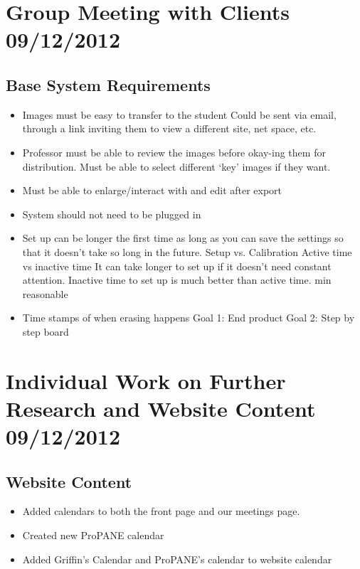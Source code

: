 \documentclass[]{article}
\begin{document}
	\tableofcontents
	\newpage
	
	
	\section{Group Meeting with Clients 09/12/2012}
		\subsection{Base System Requirements}
			\begin{itemize}
				\item Images must be easy to transfer to the student
					\subitem Could be sent via email, through a link inviting them to view a different site, net space, etc.
				\item Professor must be able to review the images before okay-ing them for distribution.
					\subitem Must be able to select different ‘key’ images if they want.
				\item Must be able to enlarge/interact with and edit after export
				\item System should not need to be plugged in
				\item Set up can be longer the first time as long as you can save the settings so that it doesn’t take so long in the future.
					\subitem Setup vs. Calibration
					\subitem Active time vs inactive time
						\subsubitem It can take longer to set up if it doesn’t need constant attention. Inactive time to set up is much better than active time.
					 min reasonable
				\item Time stamps of when erasing happens
					\subitem Goal 1: End product
					\subitem Goal 2: Step by step board
			\end{itemize}
	
	
	\section{Individual Work on Further Research and Website Content 09/12/2012}
		\subsection{Website Content}
			\begin{itemize}
				\item Added calendars to both the front page and our meetings page.
				\item Created new ProPANE calendar
				\item Added Griffin's Calendar and ProPANE's calendar to website calendar
			\end{itemize}
\end{document}

